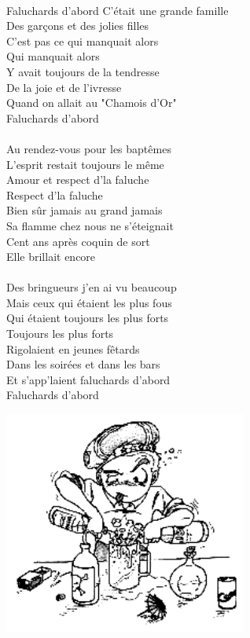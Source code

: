\\Faluchards d'abord
\breakpage
C'était une grande famille
\\Des garçons et des jolies filles
\\C'est pas ce qui manquait alors
\\Qui manquait alors
\\Y avait toujours de la tendresse
\\De la joie et de l'ivresse
\\Quand on allait au "Chamois d'Or"
\\Faluchards d'abord
\\\\Au rendez-vous pour les baptêmes
\\L'esprit restait toujours le même
\\Amour et respect d'la faluche
\\Respect d'la faluche
\\Bien sûr jamais au grand jamais
\\Sa flamme chez nous ne s'éteignait
\\Cent ans après coquin de sort
\\Elle brillait encore
\\\\Des bringueurs j'en ai vu beaucoup
\\Mais ceux qui étaient les plus fous
\\Qui étaient toujours les plus forts
\\Toujours les plus forts
\\Rigolaient en jeunes fêtards
\\Dans les soirées et dans les bars
\\Et s'app'laient faluchards d'abord
\\Faluchards d'abord
\begin{center}
\includegraphics[width=0.6\textwidth]{images/faluchard.png}
\end{center}

\breakpage